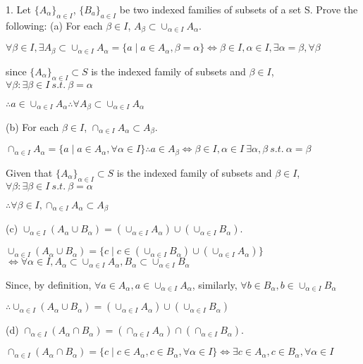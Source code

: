 1. Let $\{A_{\alpha}\}_{\alpha \in I} $, $\{ B_{a}\}_{a \in I}$ be two indexed families of subsets of a set S.
Prove the following:
(a) For each $\beta \in I$, $A_{\beta} \subset \cup_{\alpha \in I} A_{\alpha}$.

$\forall \beta \in I, \exists A_{\beta} \subset \cup_{\alpha \in I} A_{\alpha} = \{a \mid a \in A_{\alpha}, \beta = \alpha  \} \iff \beta \in I, \alpha \in I, \exists \alpha =\beta  , \forall\beta $

since $\{ A_{\alpha}\}_{\alpha \in I} \subset S$ is the indexed family of subsets and $\beta \in I$, $\forall \beta:\exists \beta \in I \  s.t. \ \beta = \alpha$ 

$\therefore a \in \cup_{\alpha \in I} A_{\alpha} \therefore \forall A_{\beta} \subset \cup_{\alpha \in I} A_{\alpha}$

(b) For each $\beta \in I$, $\cap_{\alpha \in I} A_{\alpha} \subset A_{\beta}$.

$\cap_{\alpha \in I} A_{\alpha} = \{ a \mid  a \in A_{\alpha}, \forall \alpha \in I\} \therefore a \in A_{\beta} \iff \beta \in I, \alpha\in I \ \exists \alpha, \beta \ s.t. \ \alpha = \beta$ 

Given that $\{ A_{\alpha}\}_{\alpha \in I} \subset S$ is the indexed family of subsets and $\beta \in I$, $\forall \beta:\exists \beta \in I \  s.t. \ \beta = \alpha$ 

$\therefore \forall \beta \in I, \cap_{\alpha \in I} A_{\alpha} \subset A_{\beta}$

(c) $\cup_{\alpha \in I} (A_{\alpha} \cup B_{\alpha}) = (\cup_{\alpha\in I} A_{\alpha}) \cup (\cup_{\alpha \in I} B_{\alpha})$.

$\cup_{\alpha \in I} (A_{\alpha} \cup B_{\alpha})  = \{ c \mid c \in (\cup_{\alpha \in I} B_{\alpha}) \cup  (\cup_{\alpha\in I} A_{\alpha}) \} $ $\iff  \forall \alpha \in I, A_{\alpha} \subset \cup_{\alpha \in I} A_{\alpha}, B_{\alpha} \subset \cup_{\alpha \in I}B_{\alpha} $ 

Since, by definition, $\forall a \in A_{\alpha}, a \in \cup_{\alpha \in I} A_{\alpha}$, similarly, $\forall b \in B_{\alpha}, b \in \cup_{\alpha \in I} B_{\alpha}$

$\therefore \cup_{\alpha \in I} (A_{\alpha} \cup B_{\alpha}) = (\cup_{\alpha\in I} A_{\alpha}) \cup (\cup_{\alpha \in I} B_{\alpha})$


(d) $\cap_{\alpha \in I } (A_{\alpha } \cap B_{\alpha}) = (\cap_{\alpha \in I} A_{\alpha}) \cap (\cap_{\alpha \in I} B_{\alpha})$.

$\cap_{\alpha \in I} (A_{\alpha} \cap B_{\alpha}) = \{c \mid c\in  A_{\alpha}, c\in B_{\alpha}, \forall \alpha \in I\} \iff \exists c \in A_{\alpha}, c \in B_{\alpha}, \forall \alpha \in I$

